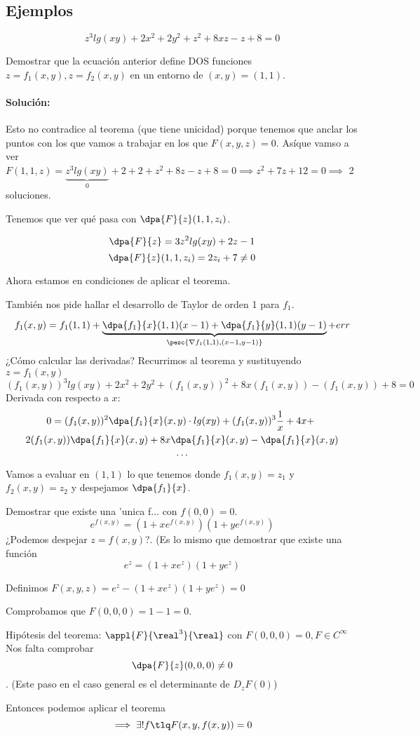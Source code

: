 \subsection{Ejemplos}
\begin{example}

$$z^3lg(xy) + 2x^2 + 2y^2 +z^2 + 8xz - z + 8 =0$$

Demostrar que la ecuación anterior define DOS funciones $z = f_1(x,y), z = f_2(x,y)$ en un entorno de $(x,y)=(1,1)$.

\paragraph{Solución: }

Esto no contradice al teorema (que tiene unicidad) porque tenemos que anclar los puntos con los que vamos a trabajar en los que $F(x,y,z) = 0$. Asíque vamso a ver $F(1,1,z) = \underbrace{z^3lg(xy)}_{0} + 2 + 2 + z^2 + 8z -z +8 = 0 \implies z^2+7z+12 = 0 \implies $ 2 soluciones.

Tenemos que ver qué pasa con $\displaystyle \dpa{F}{z}(1,1,z_i)$.

\[\dpa{F}{z} = 3z^2lg(xy) + 2z -1\]
\[\dpa{F}{z}(1,1,z_i) = 2z_i + 7 \neq 0\]

Ahora estamos en condiciones de aplicar el teorema.

También nos pide hallar el desarrollo de Taylor de orden 1 para $f_1$.

\[f_1(x,y) = f_1(1,1) + \underbrace{\dpa{f_1}{x}(1,1)(x-1) + \dpa{f_1}{y}(1,1) (y-1)}_{\pesc{\nabla f_1(1,1),(x-1,y-1)}} + err\]
¿Cómo calcular las derivadas? Recurrimos al teorema y sustituyendo $z=f_1(x,y)$
\[(f_1(x,y))^3 lg(xy) + 2x^2 + 2y^2 + (f_1(x,y))^2 + 8x(f_1(x,y))-(f_1(x,y))+8 = 0\]
Derivada con respecto a $x$:
\begin{gather*}
 0 = (f_1(x,y))^2\dpa{f_1}{x}(x,y)\cdot lg(xy) + (f_1(x,y))^3 \frac{1}{x}+4x + \\ 2(f_1(x,y))\dpa{f_1}{x}(x,y) + 8x\dpa{f_1}{x}(x,y) - \dpa{f_1}{x}(x,y) \\
 \dotsb
 \end{gather*}
Vamos a evaluar en $(1,1)$ lo que tenemos donde $f_1(x,y) = z_1$ y $f_2(x,y) = z_2$ y despejamos $\dpa{f_1}{x}$.
\end{example}

\begin{example}

Demostrar que existe una 'unica f... con $f(0,0) = 0$.
$$e^{f(x,y)} = (1+xe^{f(x,y)})(1+ye^{f(x,y)})$$
¿Podemos despejar $z = f(x,y)$?. (Es lo mismo que demostrar que existe una función $$e^{z} = (1+xe^z)(1+ye^z)$$

Definimos $F(x,y,z) = e^z - (1+xe^z)(1+ye^z) = 0$

Comprobamos que $F(0,0,0) = 1-1 = 0$.

Hipótesis del teorema: $\appl{F}{\real^3}{\real}$ con $F(0,0,0) = 0, F \in C^{\infty}$
Nos falta comprobar \[\dpa{F}{z}(0,0,0) \neq 0\]. (Este paso en el caso general es el determinante de $D_zF(0)$)

Entonces podemos aplicar el teorema 
\[\implies \exists ! f \tlq F(x,y,f(x,y)) = 0\]
\end{example}

